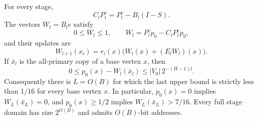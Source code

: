 \begin{proposition}
\label{prop:hier-reward-target}
For every stage,
\begin{equation}
 C_lP_l^c=P_l^c-B_l(I-S).
 \label{eq:hier-reward-algebra}
\end{equation}
The vectors $W_l=B_le$ satisfy
\begin{equation}
 0\leq W_l\leq1,\qquad
 W_l=P_l^cp_0-C_lP_l^cp_0,
 \label{eq:hier-reward-bound}
\end{equation}
and their updates are
\begin{equation}
 W_{l+1}(x_i)=r_i(x)\bigl(W_l(x)+(E_lW_l)(x)\bigr).
 \label{eq:hier-reward-update}
\end{equation}
If $\bar x_l$ is the all-primary copy of a base vertex $x$, then
\begin{equation}
 0\leq p_0(x)-W_l(\bar x_l)
       \leq |V_0|\,2^{-(H-1)l}.
 \label{eq:hier-final-error}
\end{equation}
Consequently there is $L=O(B)$ for which the last upper bound is
strictly less than $1/16$ for every base vertex $x$.
In particular, $p_0(x)=0$ implies $W_L(\bar x_L)=0$, and
$p_0(x)\ge1/2$ implies $W_L(\bar x_L)>7/16$.
Every full stage domain has size $2^{O(B)}$ and admits $O(B)$-bit
addresses.
\end{proposition}

